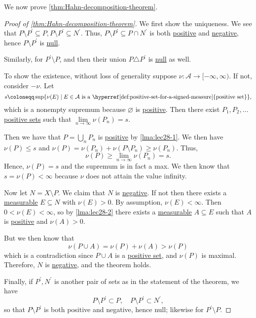 We now prove \autoref{thm:Hahn-decomposition-theorem}.
\begin{proof}[Proof of \autoref{thm:Hahn-decomposition-theorem}]
	We first show the uniqueness. We see that \(P \setminus P^\prime \subseteq P, P \setminus P^\prime  \subseteq N^\prime \). Thus, \(P \setminus P^\prime  \subseteq P \cap N^\prime \)
	is both \hyperref[def:positive-set-for-a-signed-measure]{positive} and \hyperref[def:negative-set-for-a-signed-measure]{negative}, hence \(P \setminus P^\prime\) is \hyperref[def:null-set-for-a-signed-measure]{null}.

	Similarly, for \(P^\prime \setminus P\), and then their union \(P \triangle P^\prime\) is \hyperref[def:null-set-for-a-signed-measure]{null} as well.

	\par To show the existence, without loss of generality suppose \(\nu \colon \mathcal{A} \to [-\infty,\infty)\). If not, consider \(-\nu\). Let
	\[
		s \coloneqq \sup\{\nu(E) \mid E \in \mathcal{A} \text{ is a \hyperref[def:positive-set-for-a-signed-measure]{positive set}}\},
	\]
	which is a nonempty supremum because \(\varnothing\) is \hyperref[def:positive-set-for-a-signed-measure]{positive}. Then there exist
	\(P_1,P_2,\ldots\) \hyperref[def:positive-set-for-a-signed-measure]{positive sets} such that \(\lim\limits_{n\to \infty } \nu(P_n) = s\).

	Then we have that \(P = \bigcup_n P_n\) is \hyperref[def:positive-set-for-a-signed-measure]{positive} by \autoref{lma:lec28-1}.
	We then have \(\nu(P) \leq s\) and \(\nu(P) = \nu(P_n) + \nu(P \setminus P_n) \geq \nu(P_n)\). Thus,
	\[
		\nu(P) \geq \lim_{n \to \infty} \nu(P_n) = s.
	\]
	Hence, \(\nu(P) = s\) and the supremum is in fact a max. We then know that \(s = \nu(P) < \infty\) because \(\nu\) does not attain the value infinity.

	Now let \(N = X \setminus P\). We claim that \(N\) is \hyperref[def:negative-set-for-a-signed-measure]{negative}. If not then there exists a
	\hyperref[def:measurable-set]{measurable} \(E \subseteq N\) with \(\nu(E) > 0\).
	By assumption, \(\nu(E) < \infty\). Then \(0 < \nu(E) < \infty\), so by \autoref{lma:lec28-2} there exists a \hyperref[def:measurable-set]{measurable}
	\(A \subseteq E\) such that \(A\) is \hyperref[def:positive-set-for-a-signed-measure]{positive} and \(\nu(A) > 0\).

	But we then know that
	\[
		\nu(P \cup A) = \nu(P) + \nu(A) > \nu(P)
	\]
	which is a contradiction since \(P \cup A\) is a \hyperref[def:positive-set-for-a-signed-measure]{positive set}, and \(\nu(P)\) is maximal. Therefore,
	\(N\) is \hyperref[def:negative-set-for-a-signed-measure]{negative}, and the theorem holds.

	\par Finally, if \(P^\prime , N^\prime \) is another pair of sets as in the statement of the theorem, we have
	\[
		P\setminus P^\prime \subset P,\quad P\setminus P^\prime \subset N^\prime,
	\]
	so that \(P\setminus P^\prime \) is both positive and negative, hence null; likewise for \(P^\prime \setminus P\).
\end{proof}

